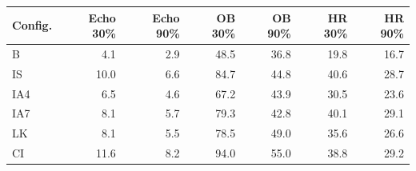 \begin{tabular}{lrrrrrr}
\toprule
Config. & Echo 30\% & Echo 90\% & OB 30\% & OB 90\% & HR 30\% & HR 90\% \\
\midrule
B & 4.1 & 2.9 & 48.5 & 36.8 & 19.8 & 16.7 \\
IS & 10.0 & 6.6 & 84.7 & 44.8 & 40.6 & 28.7 \\
IA4 & 6.5 & 4.6 & 67.2 & 43.9 & 30.5 & 23.6 \\
IA7 & 8.1 & 5.7 & 79.3 & 42.8 & 40.1 & 29.1 \\
LK & 8.1 & 5.5 & 78.5 & 49.0 & 35.6 & 26.6 \\
CI & 11.6 & 8.2 & 94.0 & 55.0 & 38.8 & 29.2 \\
\bottomrule
\end{tabular}
